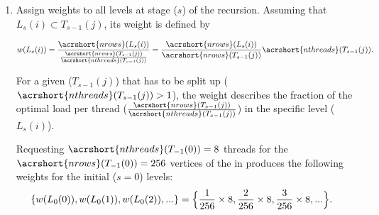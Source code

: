 \begin{enumerate}
	\item  Assign weights to all levels at stage ($s$) of the recursion. Assuming that $L_s(i) \subset T_{s-1}(j)$, its weight is defined by
	
	\begin{align*}
		w(L_s(i)) &= \frac{\acrshort{nrows}(L_s(i))}{\frac{\acrshort{nrows}(T_{s-1}(j))}{\acrshort{nthreads}(T_{s-1}(j))}} = \frac{\acrshort{nrows}(L_s(i))}{\acrshort{nrows}(T_{s-1}(j))}  \acrshort{nthreads}(T_{s-1}(j)).\\
	\end{align*}
	
	 For a given \levelGroup ($T_{s-1}(j)$) that has to be split up ( $\acrshort{nthreads}(T_{s-1}(j)) > 1$), the weight describes the fraction of the optimal load per thread  ($\frac{\acrshort{nrows}(T_{s-1}(j))}{\acrshort{nthreads}(T_{s-1}(j))}$) in the specific level ($L_s(i)$).

	Requesting $\acrshort{nthreads}(T_{-1}(0))=8$ threads for the $\acrshort{nrows}(T_{-1}(0)) = 256$ vertices of the \stex in  produces the following weights for the initial ($s=0$) levels:
	\begin{align*}
		\{w(L_0(0)), w(L_0(1)), w(L_0(2)), ...\} &= \Big{\{} \frac{1}{256} \times 8 , \frac{2}{256} \times 8 , \frac{3}{256} \times 8 , ...\Big{\}}.
	\end{align*}
	

\end{enumerate}
